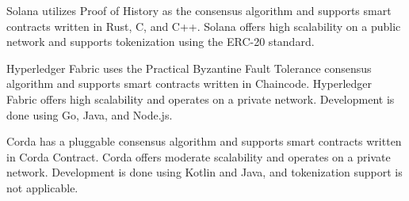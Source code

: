 Solana utilizes Proof of History as the consensus algorithm and supports smart contracts written in Rust, C, and C++. Solana offers high scalability on a public network and supports tokenization using the ERC-20 standard.

Hyperledger Fabric uses the Practical Byzantine Fault Tolerance consensus algorithm and supports smart contracts written in Chaincode. Hyperledger Fabric offers high scalability and operates on a private network. Development is done using Go, Java, and Node.js.

Corda has a pluggable consensus algorithm and supports smart contracts written in Corda Contract. Corda offers moderate scalability and operates on a private network. Development is done using Kotlin and Java, and tokenization support is not applicable.    
